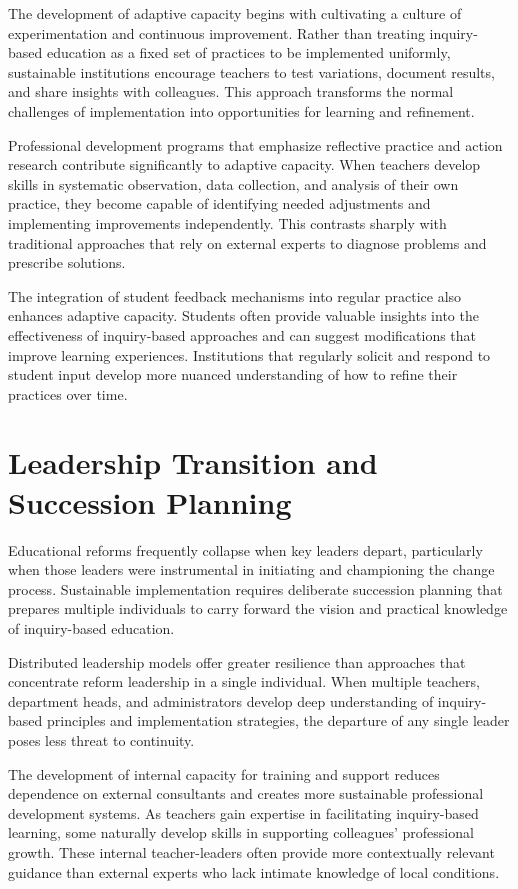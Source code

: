 \documentclass[
  Letterpaper,
]{scrbook}
\begin{document}
The development of adaptive capacity begins with cultivating a culture
of experimentation and continuous improvement. Rather than treating
inquiry-based education as a fixed set of practices to be implemented
uniformly, sustainable institutions encourage teachers to test
variations, document results, and share insights with colleagues. This
approach transforms the normal challenges of implementation into
opportunities for learning and refinement.

Professional development programs that emphasize reflective practice and
action research contribute significantly to adaptive capacity. When
teachers develop skills in systematic observation, data collection, and
analysis of their own practice, they become capable of identifying
needed adjustments and implementing improvements independently. This
contrasts sharply with traditional approaches that rely on external
experts to diagnose problems and prescribe solutions.

The integration of student feedback mechanisms into regular practice
also enhances adaptive capacity. Students often provide valuable
insights into the effectiveness of inquiry-based approaches and can
suggest modifications that improve learning experiences. Institutions
that regularly solicit and respond to student input develop more nuanced
understanding of how to refine their practices over time.

\section{Leadership Transition and Succession
Planning}\label{leadership-transition-and-succession-planning}

Educational reforms frequently collapse when key leaders depart,
particularly when those leaders were instrumental in initiating and
championing the change process. Sustainable implementation requires
deliberate succession planning that prepares multiple individuals to
carry forward the vision and practical knowledge of inquiry-based
education.

Distributed leadership models offer greater resilience than approaches
that concentrate reform leadership in a single individual. When multiple
teachers, department heads, and administrators develop deep
understanding of inquiry-based principles and implementation strategies,
the departure of any single leader poses less threat to continuity.

The development of internal capacity for training and support reduces
dependence on external consultants and creates more sustainable
professional development systems. As teachers gain expertise in
facilitating inquiry-based learning, some naturally develop skills in
supporting colleagues' professional growth. These internal
teacher-leaders often provide more contextually relevant guidance than
external experts who lack intimate knowledge of local conditions.
\end{document}
